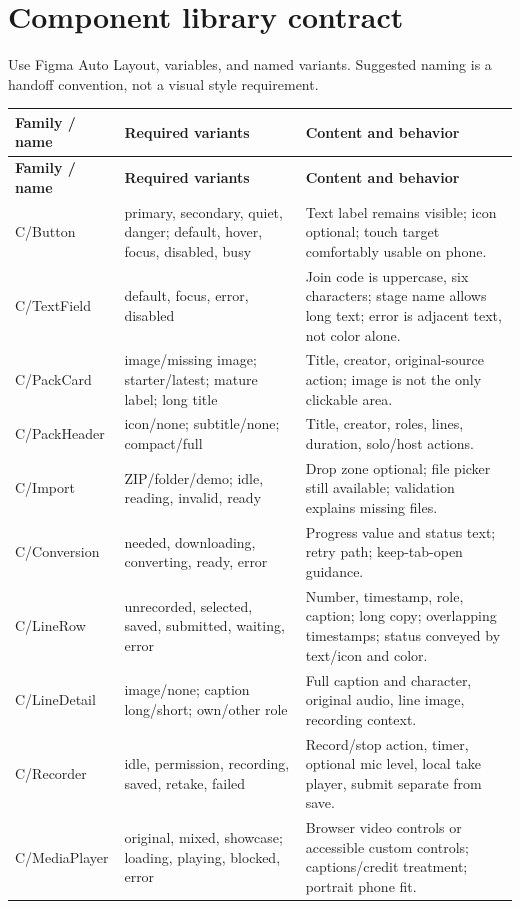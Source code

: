 \documentclass[10pt,a4paper]{article}
\begin{document}
\clearpage
\section{Component library contract}
Use Figma Auto Layout, variables, and named variants. Suggested naming is a handoff convention, not a visual style requirement.
\small
\renewcommand{\arraystretch}{1.15}
\begin{longtable}{@{}>{\raggedright\arraybackslash}p{29mm}>{\raggedright\arraybackslash}p{58mm}>{\raggedright\arraybackslash}p{71mm}@{}}
\toprule
\textbf{Family / name} & \textbf{Required variants} & \textbf{Content and behavior}\\
\midrule\endfirsthead
\toprule\textbf{Family / name} & \textbf{Required variants} & \textbf{Content and behavior}\\\midrule\endhead
C/Button & primary, secondary, quiet, danger; default, hover, focus, disabled, busy & Text label remains visible; icon optional; touch target comfortably usable on phone.\\
C/TextField & default, focus, error, disabled & Join code is uppercase, six characters; stage name allows long text; error is adjacent text, not color alone.\\
C/PackCard & image/missing image; starter/latest; mature label; long title & Title, creator, original-source action; image is not the only clickable area.\\
C/PackHeader & icon/none; subtitle/none; compact/full & Title, creator, roles, lines, duration, solo/host actions.\\
C/Import & ZIP/folder/demo; idle, reading, invalid, ready & Drop zone optional; file picker still available; validation explains missing files.\\
C/Conversion & needed, downloading, converting, ready, error & Progress value and status text; retry path; keep-tab-open guidance.\\
C/LineRow & unrecorded, selected, saved, submitted, waiting, error & Number, timestamp, role, caption; long copy; overlapping timestamps; status conveyed by text/icon and color.\\
C/LineDetail & image/none; caption long/short; own/other role & Full caption and character, original audio, line image, recording context.\\
C/Recorder & idle, permission, recording, saved, retake, failed & Record/stop action, timer, optional mic level, local take player, submit separate from save.\\
C/MediaPlayer & original, mixed, showcase; loading, playing, blocked, error & Browser video controls or accessible custom controls; captions/credit treatment; portrait phone fit.\\

\end{longtable}
\end{document}
